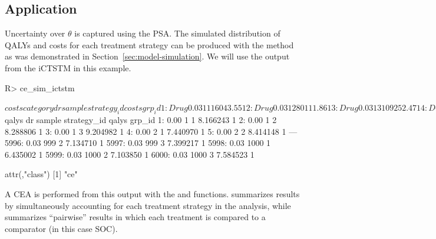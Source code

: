 \documentclass[article, nojss]{jss}\usepackage[]{graphicx}\usepackage[]{color}
\begin{document}
\subsection{Application}
Uncertainty over $\theta$ is captured using the PSA. The simulated distribution of QALYs and costs for each treatment strategy can be produced with the  method as was demonstrated in Section~\ref{sec:model-simulation}. We will use the output from the iCTSTM in this example. 

\begin{Schunk}
\begin{Sinput}
R> ce_sim_ictstm
\end{Sinput}
\begin{Soutput}
$costs
      category   dr sample strategy_id     costs grp_id
   1:     Drug 0.03      1           1  16043.55      1
   2:     Drug 0.03      1           2  80111.86      1
   3:     Drug 0.03      1           3 109252.47      1
   4:     Drug 0.03      2           1  14645.16      1
   5:     Drug 0.03      2           2  77962.49      1
  ---                                                  
8996:    total 0.03    999           2  95024.16      1
8997:    total 0.03    999           3 122357.69      1
8998:    total 0.03   1000           1  52638.13      1
8999:    total 0.03   1000           2 119410.47      1
9000:    total 0.03   1000           3 151164.45      1

$qalys
        dr sample strategy_id    qalys grp_id
   1: 0.00      1           1 8.166243      1
   2: 0.00      1           2 8.288806      1
   3: 0.00      1           3 9.204982      1
   4: 0.00      2           1 7.440970      1
   5: 0.00      2           2 8.414148      1
  ---                                        
5996: 0.03    999           2 7.134710      1
5997: 0.03    999           3 7.399217      1
5998: 0.03   1000           1 6.435002      1
5999: 0.03   1000           2 7.103850      1
6000: 0.03   1000           3 7.584523      1

attr(,"class")
[1] "ce"
\end{Soutput}
\end{Schunk}

A CEA is performed from this output with the  and  functions.  summarizes results by simultaneously accounting for each treatment strategy in the analysis, while  summarizes ``pairwise'' results in which each treatment is compared to a comparator (in this case SOC). 
\end{document}
